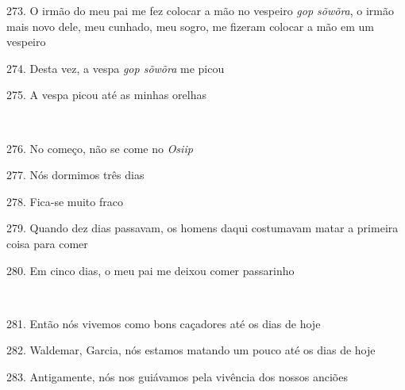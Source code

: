 273. O irmão do meu pai me fez colocar a mão no vespeiro \emph{gop
sõwõra}, o irmão mais novo dele, meu cunhado, meu sogro, me fizeram
colocar a mão em um vespeiro

274. Desta vez, a vespa \emph{gop sõwõra} me picou

275. A vespa picou até as minhas orelhas

~

276. No começo, não se come no \emph{Osiip}

277. Nós dormimos três dias

278. Fica-se muito fraco

279. Quando dez dias passavam, os homens daqui costumavam matar a
primeira coisa para comer

280. Em cinco dias, o meu pai me deixou comer passarinho

~

281. Então nós vivemos como bons caçadores até os dias de hoje

282. Waldemar, Garcia, nós estamos matando um pouco até os dias de hoje

283. Antigamente, nós nos guiávamos pela vivência dos nossos anciões



